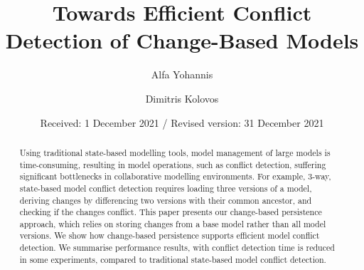 
\renewcommand{\labelitemi}{$\bullet$}
\newcommand{\AndA}{\textnormal{\textbf{and }}}
\newcommand{\Is}{\textnormal{\textbf{is }}}
\newcommand{\Not}{\textnormal{\textbf{not }}}
\newcommand{\In}{\textnormal{\textbf{in }}}
\newcommand{\Or}{\textnormal{\textbf{or }}}
\newcommand{\eqnum}{\refstepcounter{equation}\textup{\tagform@{\theequation}}}

%
%

%
\title{Towards Efficient Conflict Detection of Change-Based Models}
\author{Alfa Yohannis 
	\and Dimitris Kolovos%
}                     %
%
\offprints{}          %
%
%
\date{Received: 1 December 2021 / Revised version: 31 December 2021}
%
\maketitle
%
\begin{abstract}
Using traditional state-based modelling tools, model management of large models is time-consuming, resulting in model operations, such as conflict detection, suffering significant bottlenecks in collaborative modelling environments. For example, 3-way, state-based model conflict detection requires loading three versions of a model, deriving changes by differencing two versions with their common ancestor, and checking if the changes conflict. This paper presents our change-based persistence approach, which relies on storing changes from a base model rather than all model versions. We show how change-based persistence supports efficient model conflict detection. We summarise performance results, with conflict detection time is reduced in some experiments, compared to traditional state-based model conflict detection.
\end{abstract}
%

